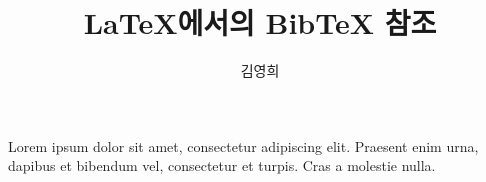 \documentclass{article}
\title{LaTeX에서의 BibTeX 참조}
\author{김영희}
\begin{document}
\maketitle

Lorem ipsum dolor sit amet, consectetur adipiscing elit. Praesent enim urna, dapibus et bibendum vel, consectetur et turpis. Cras a molestie nulla. \cite{Hemingway1952}
\medskip



\end{document}
